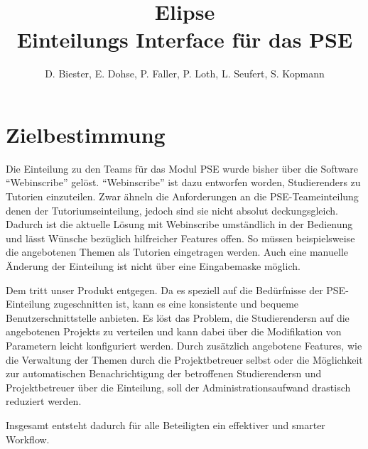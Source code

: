 \documentclass[parskip=full]{scrartcl}
\begin{document}
\title{Elipse\\
        \large  \gls{Einteilung}s Interface für das \gls{PSE}}

\author{D. Biester, E. Dohse, P. Faller, P. Loth, L. Seufert, S. Kopmann}
        
\maketitle
 
\pagebreak
\tableofcontents
\pagebreak

\section{Zielbestimmung}

Die \gls{Einteilung} zu den \glspl{Team} für das \gls{Modul} \gls{PSE} wurde
bisher über die Software \enquote{Webinscribe} gelöst.
\enquote{Webinscribe} ist dazu entworfen worden, \glspl{Studierender} zu Tutorien einzuteilen.
Zwar ähneln die Anforderungen an die \gls{PSE}-\gls{Team}einteilung denen der Tutoriumseinteilung,
jedoch sind sie nicht absolut deckungsgleich. 
Dadurch ist die aktuelle Lösung mit Webinscribe umständlich in der Bedienung und lässt Wünsche bezüglich hilfreicher Features offen.
So müssen beispielsweise die angebotenen Themen als Tutorien eingetragen werden. 
Auch eine manuelle Änderung der \gls{Einteilung} ist nicht über eine Eingabemaske
möglich.

Dem tritt unser Produkt entgegen.
Da es speziell auf die Bedürfnisse der \gls{PSE}-\gls{Einteilung} zugeschnitten ist, 
kann es eine konsistente und bequeme Benutzerschnittstelle anbieten.
Es löst das Problem, die \glspl{Studierender}n auf die angebotenen \glspl{Projekt} zu verteilen
und kann dabei über die Modifikation von Parametern leicht konfiguriert werden.
Durch zusätzlich angebotene Features, wie die Verwaltung der Themen durch die \gls{Projektbetreuer} selbst 
oder die Möglichkeit zur automatischen Benachrichtigung der betroffenen \glspl{Studierender}n und \gls{Projektbetreuer} über die
\gls{Einteilung}, soll der Administrationsaufwand drastisch reduziert werden. 

Insgesamt entsteht dadurch für alle Beteiligten ein effektiver und smarter Workflow.
\end{document}
